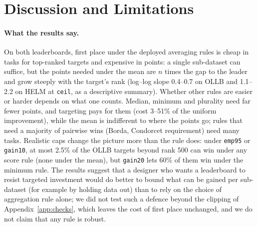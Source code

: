 \section{Discussion and Limitations}
\label{sec:disc}
\paragraph{What the results say.}
On both leaderboards, first place under the deployed averaging rules is cheap in tasks for top-ranked targets and expensive in points: a single sub-dataset can suffice, but the points needed under the mean are $n$ times the gap to the leader and grow steeply with the target's rank (log--log slope 0.4--0.7 on OLLB and 1.1--2.2 on HELM at \texttt{ceil}, as a descriptive summary). Whether other rules are easier or harder depends on what one counts. Median, minimum and plurality need far fewer points, and targeting pays for them (cost 3--51\% of the uniform improvement), while the mean is indifferent to where the points go; rules that need a majority of pairwise wins (Borda, Condorcet requirement) need many tasks. Realistic caps change the picture more than the rule does: under \texttt{emp95} or \texttt{gain10}, at most 2.5\% of the OLLB targets beyond rank 500 can win under any score rule (none under the mean), but \texttt{gain20} lets 60\% of them win under the minimum rule. The results suggest that a designer who wants a leaderboard to resist targeted investment would do better to bound what can be gained per sub-dataset (for example by holding data out) than to rely on the choice of aggregation rule alone; we did not test such a defence beyond the clipping of Appendix~\ref{app:checks}, which leaves the cost of first place unchanged, and we do not claim that any rule is robust.

